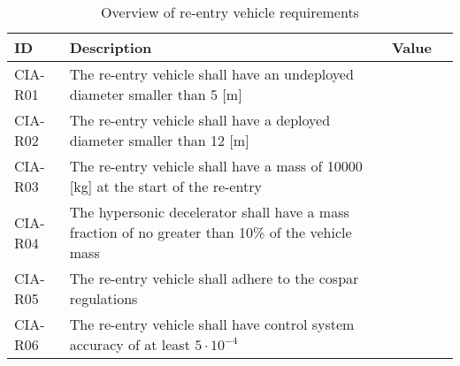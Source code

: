 \begin{table}[h]
	\caption{Overview of re-entry vehicle requirements} 
	\begin{tabular}{|p{}|p{}|c|c|}
	    \hline
	    ID          & Description   & Value &                                                                                           \\ \hline \hline
	CIA-R01 & The re-entry vehicle shall have an undeployed diameter smaller than 5 [m]                   & & \cmark     				            \\ \hline
	CIA-R02 & The re-entry vehicle shall have a deployed diameter smaller than 12 [m]                     & &  \cmark 				            \\ \hline	
	CIA-R03 & The re-entry vehicle shall have a mass of 10000 [kg] at the start of the re-entry           & &  \cmark          				            \\ \hline
	CIA-R04 & The hypersonic decelerator shall have a mass fraction of no greater than 10\% of the vehicle mass	& & \cmark \\ \hline 
	CIA-R05 &  The re-entry vehicle shall adhere to the \gls{cospar} regulations  & & \cmark \\ \hline
	CIA-R06 &  The re-entry vehicle shall have control system accuracy of at least $5\cdot 10^{-4}$ & & \cmark \\ \hline
    \end{tabular}
\end{table}















